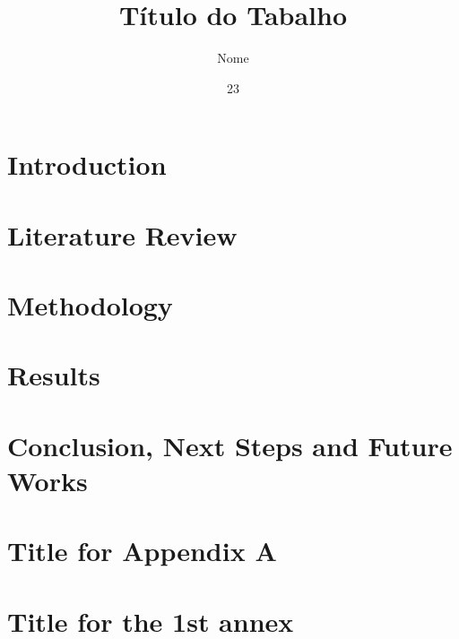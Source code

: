 \documentclass[mscfem,dv, eng]{ita}    %
\author{Nome}{Sobrenome}
\title{Título do Tabalho}
\date{23}{march}{2025}
\begin{document}


\mainmatter

\chapter{Introduction}





\chapter{Literature Review}


\chapter{Methodology}


\chapter{Results}


\chapter{Conclusion, Next Steps and Future Works}


\renewcommand\bibname{\itareferencesnamebabel} 





\appendix  %
\chapter{Title for Appendix A} %




\annex %
\chapter{Title for the 1st annex} %




\end{document}
